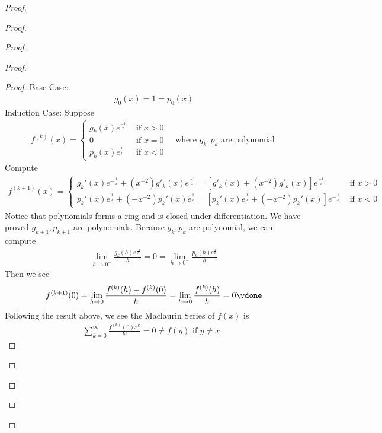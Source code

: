 \documentclass{report}
\begin{document}
\begin{proof}
\begin{proof}
\begin{proof}
\begin{proof}
\begin{proof}
Base Case: 
\begin{align*}
g_0(x)=1=p_0(x)
\end{align*}
Induction Case: Suppose
\begin{align*}
f^{(k)}(x)=\begin{cases}
  g_k(x)e^{\frac{-1}{x}}& \text{ if $x>0$ }\\
  0& \text{ if $x=0$ }\\
  p_k(x)e^{\frac{1}{x}}& \text{ if $x<0$ }
\end{cases}\text{ where $g_k,p_k$ are polynomial }
\end{align*}
Compute
\begin{align*}
f^{(k+1)}(x)=\begin{cases}
  g_k'(x)e^{-\frac{1}{x}}+(x^{-2})g'_k(x)e^{\frac{-1}{x}}=[g'_k(x)+(x^{-2})g'_k(x)]e^{\frac{-1}{x}}& \text{ if $x>0$ }\\
  p_k'(x)e^{\frac{1}{x}}+(-x^{-2})p_k'(x)e^{\frac{1}{x}}=[p_k'(x)e^{\frac{1}{x}}+(-x^{-2})p_k'(x)]e^{-\frac{1}{x}}& \text{ if $x<0$ }
\end{cases}
\end{align*}
Notice that polynomials forms a ring and is closed under differentiation. We have proved $g_{k+1},p_{k+1}$ are polynomials. Because $g_k,p_k$ are polynomial, we can compute 
\begin{align*}
\lim_{h \to 0^+}\frac{g_k(h)e^{\frac{-1}{h}}}{h}=0=\lim_{h\to 0^-}\frac{p_k(h)e^{\frac{1}{h}}}{h}
\end{align*}
Then we see 
\begin{align*}
f^{(k+1)}(0)=\lim_{h\to 0}\frac{f^{(k)}(h)-f^{(k)}(0)}{h}=\lim_{h\to 0}\frac{f^{(k)}(h)}{h}=0\vdone
\end{align*}
Following the result above, we see the Maclaurin Series of $f(x)$ is 
 \begin{align*}
\sum_{k=0}^{\infty} \frac{f^{(k)}(0) x^k}{k!}=0\neq f(y)\text{ if $y\neq x$ }
\end{align*}


\end{proof}
\begin{question}{}{}


\end{question}
\end{proof}
\end{proof}
\end{proof}
\end{proof}
\end{document}
